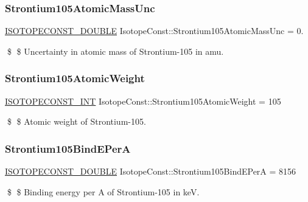 \subsubsection{\texorpdfstring{Strontium105\+Atomic\+Mass\+Unc}{Strontium105AtomicMassUnc}}
{\footnotesize\ttfamily \mbox{\hyperlink{group___isotope_const-_macros_ga8f45a7272ce02c0b4c65c44636ed719a}{I\+S\+O\+T\+O\+P\+E\+C\+O\+N\+S\+T\+\_\+\+D\+O\+U\+B\+LE}} Isotope\+Const\+::\+Strontium105\+Atomic\+Mass\+Unc = 0.}

\$ \$ Uncertainty in atomic mass of Strontium-\/105 in amu. \mbox{\label{group___isotope_const-_strontium-_sr105_ga5048d58b1914f6ba1be67d28c88bf450}} 
\subsubsection{\texorpdfstring{Strontium105\+Atomic\+Weight}{Strontium105AtomicWeight}}
{\footnotesize\ttfamily \mbox{\hyperlink{group___isotope_const-_macros_ga5f18360b3e99483a35c32d789e62621c}{I\+S\+O\+T\+O\+P\+E\+C\+O\+N\+S\+T\+\_\+\+I\+NT}} Isotope\+Const\+::\+Strontium105\+Atomic\+Weight = 105}

\$ \$ Atomic weight of Strontium-\/105. \mbox{\label{group___isotope_const-_strontium-_sr105_ga98259eaf584b9e25125ca8443ee01f52}} 
\subsubsection{\texorpdfstring{Strontium105\+Bind\+E\+PerA}{Strontium105BindEPerA}}
{\footnotesize\ttfamily \mbox{\hyperlink{group___isotope_const-_macros_ga8f45a7272ce02c0b4c65c44636ed719a}{I\+S\+O\+T\+O\+P\+E\+C\+O\+N\+S\+T\+\_\+\+D\+O\+U\+B\+LE}} Isotope\+Const\+::\+Strontium105\+Bind\+E\+PerA = 8156}

\$ \$ Binding energy per A of Strontium-\/105 in keV. \mbox{\label{group___isotope_const-_strontium-_sr105_ga06fc82790e1ec7b1654870713b344507}} 
